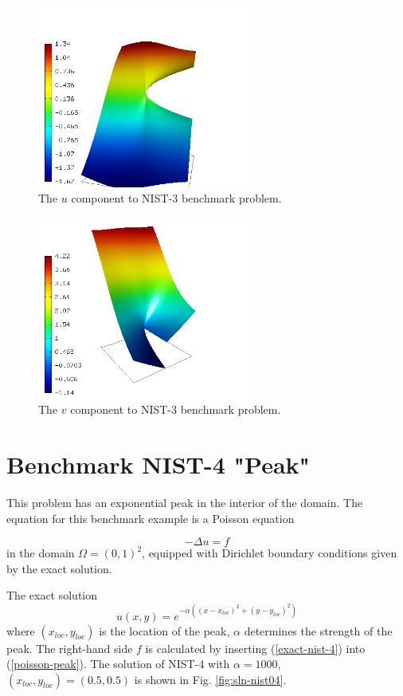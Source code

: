 \documentclass[12pt]{elsarticle}
\begin{document}
\begin{figure}[!ht]
\centering
\includegraphics[height=6cm]{nist/nist-3/solution-u.png}
\caption{The $u$ component to NIST-3 benchmark problem.}
\label{fig:sln-nist03-u}
\end{figure}

\begin{figure}[!ht]
\centering
\includegraphics[height=6cm]{nist/nist-3/solution-v.png}
\caption{The $v$ component to NIST-3 benchmark problem.}
\label{fig:sln-nist03-v}
\end{figure}

\section{Benchmark NIST-4 "Peak"}
\label{sec:bench-4}

This problem has an exponential peak in the interior of the domain.
The equation for this benchmark example is a Poisson equation

\begin{equation} \label{poisson-peak}
-\Delta u = f
\end{equation}
in the domain $\Omega = (0, 1)^2$, equipped with Dirichlet
boundary conditions given by the exact solution.

The exact solution
\begin{equation}\label{exact-nist-4}
u(x,y) = e^{-\alpha ((x - x_{loc})^{2} + (y - y_{loc})^{2})}
\end{equation}
where $(x_{loc}, y_{loc})$ is the location of the peak,
$\alpha$ determines the strength of the peak.
The right-hand side $f$ is calculated by inserting (\ref{exact-nist-4}) into (\ref{poisson-peak}).
The solution of NIST-4 with $\alpha = 1000$, $(x_{loc}, y_{loc}) = (0.5, 0.5)$ is shown in Fig. \ref{fig:sln-nist04}.
\end{document}

